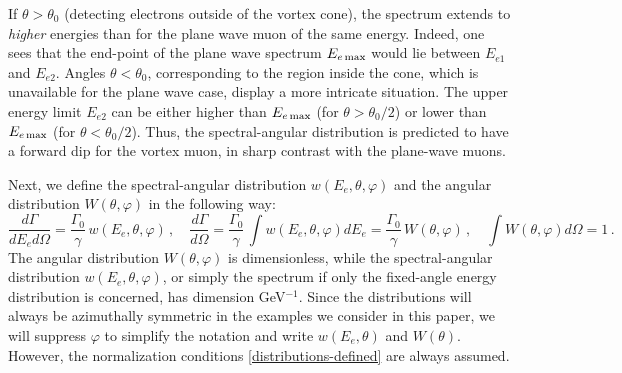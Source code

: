 \documentclass[aps,prd,longbibliography,nofootinbib,amsthm,amsmath,amssymb,amsfonts,notitlepage]{revtex4-1}
\begin{document}
If $\theta > \theta_0$ (detecting electrons outside of the vortex cone),
the spectrum extends to {\em higher} energies than for the plane wave muon of the same energy.
Indeed, one sees that the end-point of the plane wave spectrum $E_{e\,\rm max}$ would lie between $E_{e1}$ and $E_{e2}$.
Angles $\theta < \theta_0$, corresponding to the region inside the cone, which is unavailable for the plane wave case,
display a more intricate situation. The upper energy limit $E_{e2}$ can be either higher than $E_{e\,\rm max}$ (for $\theta > \theta_0/2$)
or lower than $E_{e\,\rm max}$ (for $\theta < \theta_0/2$). Thus, the spectral-angular distribution is predicted to have a forward dip
for the vortex muon, in sharp contrast with the plane-wave muons.

Next, we define the spectral-angular distribution $w(E_e, \theta, \varphi)$ and the angular distribution $W(\theta, \varphi)$ in the following way:
\begin{equation}
\frac{d\Gamma}{dE_ed\Omega}= \frac{\Gamma_0}{\gamma}\, w(E_e, \theta, \varphi)\,, \quad 
\frac{d\Gamma}{d\Omega} = \frac{\Gamma_0}{\gamma}\, \int w(E_e, \theta, \varphi) dE_e = \frac{\Gamma_0}{\gamma}\, W(\theta, \varphi)\,,
\quad \int W(\theta, \varphi) d\Omega = 1\,.
\label{distributions-defined}
\end{equation}
The angular distribution $W(\theta,\varphi)$ is dimensionless, while the spectral-angular distribution $w(E_e, \theta, \varphi)$, 
or simply the spectrum if only the fixed-angle energy distribution is concerned, has dimension GeV$^{-1}$. 
Since the distributions will always be azimuthally symmetric in the examples we consider in this paper,
we will suppress $\varphi$ to simplify the notation and write $w(E_e, \theta)$ and $W(\theta)$.
However, the normalization conditions \eqref{distributions-defined} are always assumed.
\end{document}
